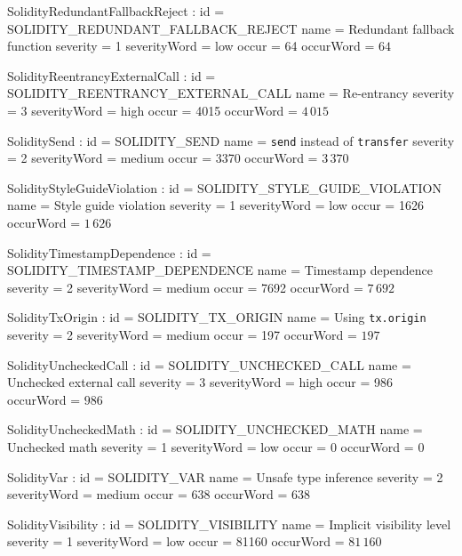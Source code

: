 \setparameter SolidityRedundantFallbackReject :
id 				= SOLIDITY\_REDUNDANT\_FALLBACK\_REJECT
name 			= {Redundant fallback function}
severity 		= 1
severityWord 	= low
occur			= 64
occurWord		= $64$

\setparameter SolidityReentrancyExternalCall :
id 				= SOLIDITY\_REENTRANCY\_EXTERNAL\_CALL
name 			= {Re-entrancy}
severity 		= 3
severityWord 	= high
occur			= 4015
occurWord		= $4\,015$

\setparameter SoliditySend :
id 				= SOLIDITY\_SEND
name 			= {\texttt{send} instead of \texttt{transfer}}
severity 		= 2
severityWord 	= medium
occur			= 3370
occurWord		= $3\,370$

\setparameter SolidityStyleGuideViolation :
id 				= SOLIDITY\_STYLE\_GUIDE\_VIOLATION
name 			= {Style guide violation}
severity 		= 1
severityWord 	= low
occur			= 1626
occurWord		= $1\,626$

\setparameter SolidityTimestampDependence :
id 				= SOLIDITY\_TIMESTAMP\_DEPENDENCE
name 			= {Timestamp dependence}
severity 		= 2
severityWord 	= medium
occur			= 7692
occurWord		= $7\,692$

\setparameter SolidityTxOrigin :
id 				= SOLIDITY\_TX\_ORIGIN
name 			= {Using \texttt{tx.origin}}
severity 		= 2
severityWord 	= medium
occur			= 197
occurWord		= $197$

\setparameter SolidityUncheckedCall :
id 				= SOLIDITY\_UNCHECKED\_CALL
name 			= {Unchecked external call}
severity 		= 3
severityWord 	= high
occur			= 986
occurWord		= $986$

\setparameter SolidityUncheckedMath :
id 				= SOLIDITY\_UNCHECKED\_MATH
name 			= {Unchecked math}
severity 		= 1
severityWord 	= low
occur			= 0
occurWord		= $0$

\setparameter SolidityVar :
id 				= SOLIDITY\_VAR
name 			= {Unsafe type inference}
severity 		= 2
severityWord 	= medium
occur			= 638
occurWord		= $638$

\setparameter SolidityVisibility :
id 				= SOLIDITY\_VISIBILITY
name 			= {Implicit visibility level}
severity 		= 1
severityWord 	= low
occur			= 81160
occurWord		= $81\,160$

\let\letcs\etoolboxletcs %
